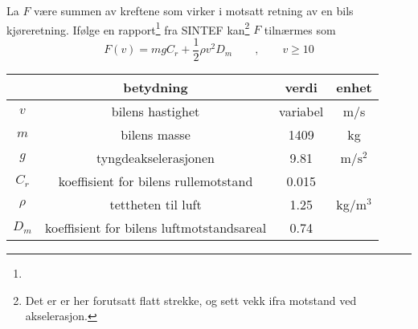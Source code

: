 \newpage
{}

La $ F $ være summen av kreftene som virker i motsatt retning av en bils kjøreretning. Ifølge en rapport\footnote{} fra SINTEF kan\footnote{Det er er her forutsatt flatt strekke, og sett vekk ifra motstand ved akselerasjon.} $ F $ tilnærmes som \vspace{-5pt}
\[ F(v)= mgC_r+\frac{1}{2}\rho v^2 D_m\qquad,\qquad v\geq10\] \vspace{-30pt}
\begin{center}
	\begin{tabular}{c|c|c|c}
		& \textbf{betydning} & \textbf{verdi}&\textbf{enhet}  \\ \hline
		$ v $ & bilens hastighet & variabel& m/s \\
		$ m $& bilens masse\footnotemark & 1409 & kg\\
		$ g $& tyngdeakselerasjonen & 9.81 & m/$ \text{s}^2 $ \\
		$ C_r $ & koeffisient for bilens rullemotstand & 0.015\\
		$ \rho $ & tettheten til luft & 1.25 & kg/$ \text{m}^3 $ \\
		$ D_m $& koeffisient for bilens luftmotstandsareal\footnotemark &0.74
	\end{tabular}
\end{center} \vs


